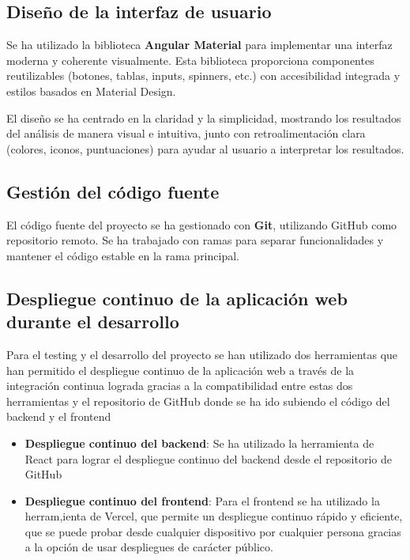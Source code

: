 \subsection{Diseño de la interfaz de usuario}

Se ha utilizado la biblioteca \textbf{Angular Material} para implementar una interfaz moderna y coherente visualmente. Esta biblioteca proporciona componentes reutilizables (botones, tablas, inputs, spinners, etc.) con accesibilidad integrada y estilos basados en Material Design.

El diseño se ha centrado en la claridad y la simplicidad, mostrando los resultados del análisis de manera visual e intuitiva, junto con retroalimentación clara (colores, iconos, puntuaciones) para ayudar al usuario a interpretar los resultados.

\subsection{Gestión del código fuente}

El código fuente del proyecto se ha gestionado con \textbf{Git}, utilizando GitHub como repositorio remoto. Se ha trabajado con ramas para separar funcionalidades y mantener el código estable en la rama principal.

\subsection{Despliegue continuo de la aplicación web durante el desarrollo}

Para el testing y el desarrollo del proyecto se han utilizado dos herramientas que han permitido el despliegue continuo de la aplicación web a través de la integración continua lograda gracias a la compatibilidad entre estas dos herramientas y el repositorio de GitHub donde se ha ido subiendo el código del backend y el frontend

\begin{itemize}
  \item \textbf{Despliegue continuo del backend}: Se ha utilizado la herramienta de React para lograr el despliegue continuo del backend desde el repositorio de GitHub
  
  \item \textbf{Despliegue continuo del frontend}: Para el frontend se ha utilizado la herram,ienta de Vercel, que permite un despliegue continuo rápido y eficiente, que se puede probar desde cualquier dispositivo por cualquier persona gracias a la opción de usar despliegues de carácter público.
  
\end{itemize}

